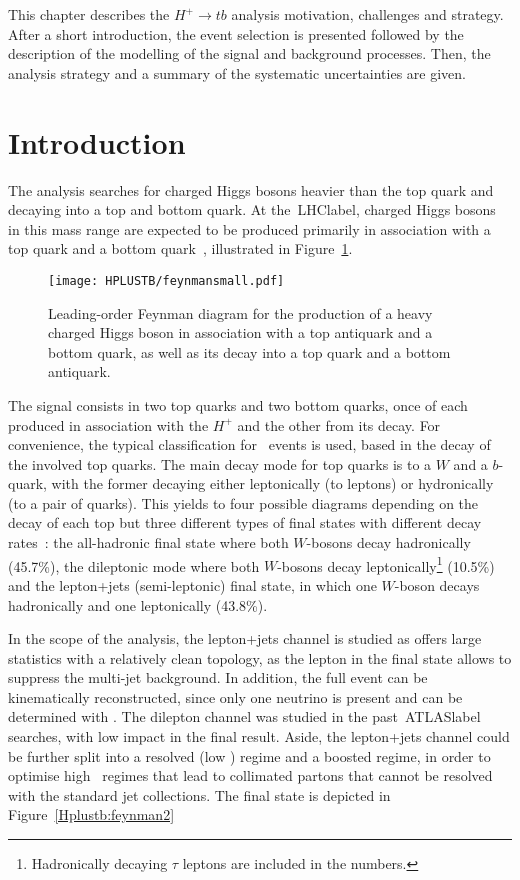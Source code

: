 This chapter describes the $H^+\to tb$ analysis motivation, challenges and strategy. After a short introduction, the event selection is presented followed by the description of the modelling of the signal and background processes. Then, the analysis strategy and a summary of the systematic uncertainties are given.



\section{Introduction}
The analysis searches for charged Higgs bosons heavier than the top quark and decaying into a top and bottom quark. At the~\acrshort{LHClabel}, charged Higgs bosons in this mass range are expected to be produced primarily in association with a top quark and a bottom quark~\cite{CYRM-2017-002}, illustrated in Figure~\ref{Hplustb:feynman1}.


\begin{figure}[htbp]
    \RawFloats
    \begin{center}
    \texttt{[image: HPLUSTB/feynmansmall.pdf]}
    \caption{
        Leading-order Feynman diagram for the production of a heavy charged Higgs boson in association with a top antiquark and a bottom quark, as well as its decay into a top quark and a bottom antiquark.
    }
    \label{Hplustb:feynman1}
    \end{center}
\end{figure}

The signal consists in two top quarks and two bottom quarks, once of each produced in association with the $H^+$ and the other from its decay. For convenience, the typical classification for \ttbar\ events is used, based in the decay of the involved top quarks. The main decay mode for top quarks is to a $W$ and a $b$-quark, with the former decaying either leptonically (to leptons) or hydronically (to a pair of quarks). This yields to four possible diagrams depending on the decay of each top but three different types of final states with different decay rates~\cite{pdg}: the all-hadronic final state where both $W$-bosons decay hadronically (45.7\%), the dileptonic mode where both $W$-bosons decay leptonically\footnote{Hadronically decaying $\tau$ leptons are included in the numbers.} (10.5\%) and the lepton+jets (semi-leptonic) final state, in which one $W$-boson decays hadronically and one leptonically (43.8\%).

In the scope of the analysis, the lepton+jets channel is studied as offers large statistics with a relatively clean topology, as the lepton in the final state allows to suppress the multi-jet background. In addition, the full event can be kinematically reconstructed, since only one neutrino is present and can be determined with \MET. The dilepton channel was studied in the past~\acrshort{ATLASlabel} searches, with low impact in the final result. Aside, the lepton+jets channel could be further split into a resolved (low \pT) regime and a boosted regime, in order to optimise high \pT\ regimes that lead to collimated partons that cannot be resolved with the standard jet collections. The final state is depicted in Figure~\ref{Hplustb:feynman2}

